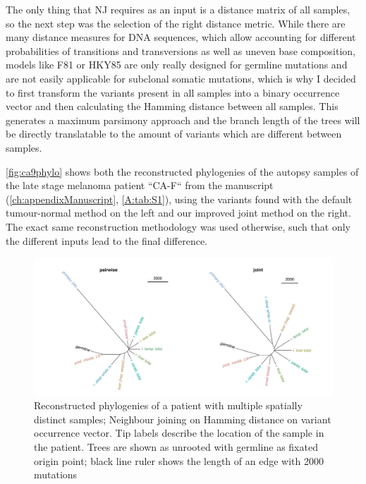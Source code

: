 The only thing that NJ requires as an input is a distance matrix of all samples, so the next step was the selection of the right distance metric. While there are many distance measures for DNA sequences, which allow accounting for different probabilities of transitions and transversions as well as uneven base composition, models like F81 \cite{Felsenstein1981} or HKY85 \cite{Hasegawa1985} are only really designed for germline mutations and are not easily applicable for subclonal somatic mutations, which is why I decided to first transform the variants present in all samples into a binary occurrence vector and then calculating the Hamming distance \cite{Hamming1950} between all samples. This generates a maximum parsimony approach and the branch length of the trees will be directly translatable to the amount of variants which are different between samples. 

\autoref{fig:ca9phylo} shows both the reconstructed phylogenies of the autopsy samples of the late stage melanoma patient ``CA-F`` from the manuscript (\autoref{ch:appendixManuscript}, \autoref{A:tab:S1}), using the variants found with the default tumour-normal method on the left and our improved joint method on the right. The exact same reconstruction methodology was used otherwise, such that only the different inputs lead to the final difference.

\begin{figure}[!ht]
\centering
\includegraphics[width=.99\linewidth]{Figures/phyloCA9.pdf}
\caption[Reconstructed phylogenies of joint samples]{Reconstructed phylogenies of a patient with multiple spatially distinct samples; Neighbour joining on Hamming distance on variant occurrence vector. Tip labels describe the location of the sample in the patient. Trees are shown as unrooted with germline as fixated origin point; black line ruler shows the length of an edge with 2000 mutations}\label{fig:ca9phylo}
\end{figure}

